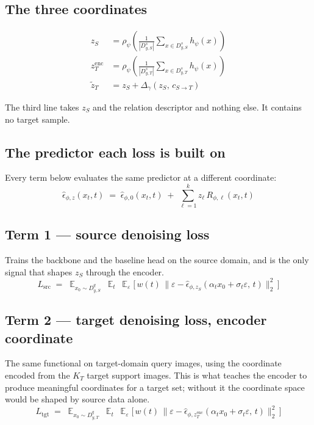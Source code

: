 \documentclass[11pt]{article}
\newcommand{\KT}{K_{T}}
\newcommand{\epshat}{\hat{\epsilon}}
\newcommand{\zS}{z_{S}}
\newcommand{\zencT}{z^{\mathrm{enc}}_{T}}
\newcommand{\ztilT}{\tilde{z}_{T}}
\newcommand{\Dss}{D^{s}_{y,S}}
\newcommand{\Dqs}{D^{q}_{y,S}}
\newcommand{\Dst}{D^{s}_{y,T}}
\newcommand{\Dqt}{D^{q}_{y,T}}
\begin{document}
\subsection{The three coordinates}

\begin{align}
\zS      &= \rho_\psi\!\left( \frac{1}{|\Dss|}\sum_{x\in \Dss} h_\psi(x) \right) \\
\zencT   &= \rho_\psi\!\left( \frac{1}{|\Dst|}\sum_{x\in \Dst} h_\psi(x) \right) \\
\ztilT   &= \zS + \Delta_\gamma\!\left( \zS,\, c_{S\to T} \right)
\end{align}

The third line takes $\zS$ and the relation descriptor and nothing else. It contains no target
sample.

\subsection{The predictor each loss is built on}

Every term below evaluates the same predictor at a different coordinate:
\begin{equation}
\epshat_{\phi,z}(x_t,t) \;=\; \epshat_{\phi,0}(x_t,t)
  \;+\; \sum_{\ell=1}^{k} z_\ell \, R_{\phi,\ell}(x_t,t)
\label{eq:pred}
\end{equation}

\subsection{Term 1 --- source denoising loss}

Trains the backbone and the baseline head on the source domain, and is the only signal that shapes
$\zS$ through the encoder.
\begin{equation}
L_{\mathrm{src}} \;=\;
\mathop{\mathbb{E}}_{x_0\sim \Dqs}\ \mathop{\mathbb{E}}_{t}\ \mathop{\mathbb{E}}_{\varepsilon}
\Big[\, w(t)\, \big\| \varepsilon - \epshat_{\phi,\zS}(\alpha_t x_0+\sigma_t\varepsilon,\, t) \big\|_2^2 \,\Big]
\end{equation}

\subsection{Term 2 --- target denoising loss, encoder coordinate}

The same functional on target-domain query images, using the coordinate encoded from the $\KT$
target support images. This is what teaches the encoder to produce meaningful coordinates for a
target set; without it the coordinate space would be shaped by source data alone.
\begin{equation}
L_{\mathrm{tgt}} \;=\;
\mathop{\mathbb{E}}_{x_0\sim \Dqt}\ \mathop{\mathbb{E}}_{t}\ \mathop{\mathbb{E}}_{\varepsilon}
\Big[\, w(t)\, \big\| \varepsilon - \epshat_{\phi,\zencT}(\alpha_t x_0+\sigma_t\varepsilon,\, t) \big\|_2^2 \,\Big]
\end{equation}
\end{document}

